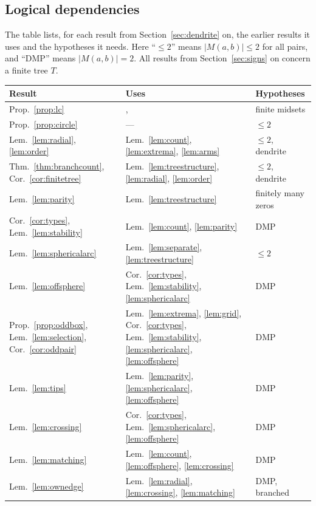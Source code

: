 \documentclass[11pt]{amsart}
\theoremstyle{definition}
\theoremstyle{remark}
\newcommand{\M}{M}
\begin{document}
\subsection{Logical dependencies}
The table lists, for each result from Section~\ref{sec:dendrite} on, the earlier results it uses and the hypotheses it needs. Here ``$\le2$'' means $|\M(a,b)|\le2$ for all pairs, and ``DMP'' means $|\M(a,b)|=2$. All results from Section~\ref{sec:signs} on concern a finite tree $T$.
\begin{center}
\small
\begin{tabular}{@{}p{}p{}p{}@{}}
\toprule
Result & Uses & Hypotheses\\
\midrule
Prop.~\ref{prop:lc} & \cite[Thm.~25.3]{Mun00}, \cite[Thm.~5.6]{Nad92} & finite midsets\\
Prop.~\ref{prop:circle} & --- & $\le2$\\
Lem.~\ref{lem:radial}, \ref{lem:order} & Lem.~\ref{lem:count}, \ref{lem:extrema}, \ref{lem:arms} & $\le2$, dendrite\\
Thm.~\ref{thm:branchcount}, Cor.~\ref{cor:finitetree} & Lem.~\ref{lem:treestructure}, \ref{lem:radial}, \ref{lem:order} & $\le2$, dendrite\\
Lem.~\ref{lem:parity} & Lem.~\ref{lem:treestructure} & finitely many zeros\\
Cor.~\ref{cor:types}, Lem.~\ref{lem:stability} & Lem.~\ref{lem:count}, \ref{lem:parity} & DMP\\
Lem.~\ref{lem:sphericalarc} & Lem.~\ref{lem:separate}, \ref{lem:treestructure} & $\le2$\\
Lem.~\ref{lem:offsphere} & Cor.~\ref{cor:types}, Lem.~\ref{lem:stability}, \ref{lem:sphericalarc} & DMP\\
Prop.~\ref{prop:oddbox}, Lem.~\ref{lem:selection}, Cor.~\ref{cor:oddpair} & Lem.~\ref{lem:extrema}, \ref{lem:grid}, Cor.~\ref{cor:types}, Lem.~\ref{lem:stability}, \ref{lem:sphericalarc}, \ref{lem:offsphere} & DMP\\
Lem.~\ref{lem:tips} & Lem.~\ref{lem:parity}, \ref{lem:sphericalarc}, \ref{lem:offsphere} & DMP\\
Lem.~\ref{lem:crossing} & Cor.~\ref{cor:types}, Lem.~\ref{lem:sphericalarc}, \ref{lem:offsphere} & DMP\\
Lem.~\ref{lem:matching} & Lem.~\ref{lem:count}, \ref{lem:offsphere}, \ref{lem:crossing} & DMP\\
Lem.~\ref{lem:ownedge} & Lem.~\ref{lem:radial}, \ref{lem:crossing}, \ref{lem:matching} & DMP, branched\\

\end{tabular}
\end{center}
\end{document}
